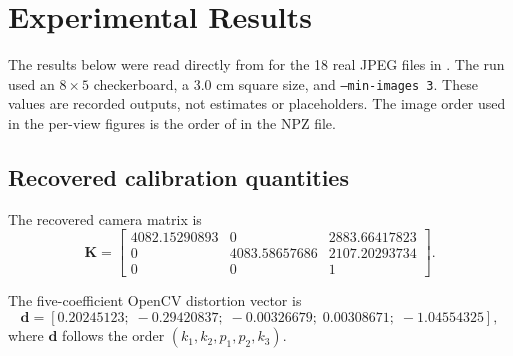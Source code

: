 \section{Experimental Results}\label{sec:task2-results}

The results below were read directly from  for the 18 real JPEG files in . The run used an $8\times5$ checkerboard, a 3.0 cm square size, and \texttt{--min-images 3}. These values are recorded outputs, not estimates or placeholders. The image order used in the per-view figures is the order of  in the NPZ file.

\subsection{Recovered calibration quantities}

The recovered camera matrix is
\begin{equation}
\mathbf K=
\begin{bmatrix}
4082.15290893 & 0 & 2883.66417823\\
0 & 4083.58657686 & 2107.20293734\\
0 & 0 & 1
\end{bmatrix}.
\label{eq:task2-result-k}
\end{equation}

The five-coefficient OpenCV distortion vector is
\begin{equation}
\mathbf d=
\left[
0.20245123;\;-0.29420837;\;-0.00326679;\;0.00308671;\;-1.04554325
\right],
\label{eq:task2-result-distortion}
\end{equation}
where $\mathbf d$ follows the order $(k_1,k_2,p_1,p_2,k_3)$.

